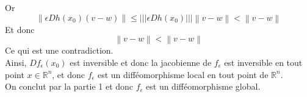 \documentclass[11pt, a4paper]{article}
\newcommand\ns[1]{\left\vert\left\vert\left\vert#1\right\vert\right\vert\right\vert}
\newcommand\N[1]{\left\lVert#1\right\rVert}
\begin{document}
Or
\[ 
\N { \epsilon Dh( x_0) ( v-w) } \leq \ns { \epsilon Dh( x_0) } \N { v-w} < \N { v-w} 
\]
Et donc
\[ 
\N { v-w} < \N { v-w} 
\]
Ce qui est une contradiction.\\
Ainsi, $Df_\epsilon( x_0) $ est inversible et donc la jacobienne  de $f_\epsilon$ est inversible en tout point $x\in \mathbb{R}^n$, et donc $f_\epsilon$ est un difféomorphisme local en tout point de $ \mathbb{R}^n$.\\
On conclut par la partie 1 et donc $f_\epsilon$ est un difféomorphisme global.
\end{document}
